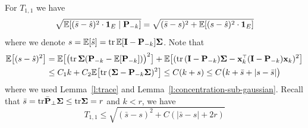 \documentclass{article}
\begin{document}
For $T_{1,1}$ we have
\[
  \sqrt{ \mathbb E [(\bar s-\hat s)^2 \cdot\mathbf 1_E \mid\mathbf P_{-k}] } = \sqrt{ (\bar s - s)^2 + \mathbb E[(s - \hat s)^2 \cdot\mathbf 1_E] }
\]
where we denote $s=\mathbb E[\hat s]=\mathrm{tr}\,\mathbb E[\mathbf I - \mathbf P_{-k}]\mathbf{\Sigma}$. Note that
\begin{align*}
  \E\big[(s - \hat s)^2 \big] &=
\E\big[\big(\tr\,\Sigmab(\P_{-k} - \E[\P_{-k}])\big)^2  \big] +
  \E\big[(\tr\,(\I - \P_{-k})\Sigmab-\x_k^\top(\I - \P_{-k})\x_k)^2  \big]\\
  &\leq C_1 k +  C_2 \E\big[\tr\,(\Sigmab - \P_{-k}\Sigmab)^2 \big] \le C(k+s)\leq C\big(k+\bar s + |s- \bar s| \big)
\end{align*}
where we used Lemma~\ref{l:trace} and Lemma~\ref{l:concentration-sub-gaussian}. Recall that $\bar s = \mathrm{tr} \bar {\mathbf P}_\perp \mathbf{\Sigma} \le \mathrm{tr} \mathbf{\Sigma} = r$ and $k < r$, we have
\begin{equation}\label{eq:bound-T11}
  T_{1,1} \le \sqrt{ (\bar s - s)^2 + C (|\bar s - s| + 2 r) }
\end{equation}

\end{document}
